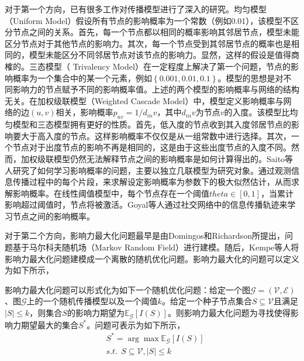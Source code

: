 对于第一个方向，已有很多工作对传播模型进行了深入的研究。均匀模型（Uniform Model）假设所有节点的影响概率为一个常数（例如0.01），该模型不区分节点之间的关系。首先，每一个节点都以相同的概率影响其邻居节点，模型未能区分节点对于其他节点的影响力。其次，每一个节点受到其邻居节点的概率也是相同的，模型未能区分不同邻居节点对该节点的影响力。显然，这样的假设是值得商榷的。三态模型（ Trivalency Model）在一定程度上解决了第一个问题，节点的影响概率为一个集合中的某一个元素，例如$\left\{ 0.001, 0.01, 0.1\right\}$。模型的思想是对不同影响力的节点赋予不同的影响概率值。上述的两个模型的影响概率与网络的结构无关。在加权级联模型（Weighted Cascade Model）中，模型定义影响概率与网络的边$\left(u,v\right)$相关，影响概率$p_{uv}=1/d_{in}v$，其中$d_{in}v$为节点$v$的入度。该模型比均匀模型和三态模型拥有更好的性质。首先，低入度的节点收到其入度邻居节点的影响要大于高入度的节点。这样影响概率不仅仅是从一组常数中进行选择。其次，一个节点对于出度节点的影响不再是相同的，这是由于这些出度节点的入度不同。然而，加权级联模型仍然无法解释节点之间的影响概率是如何计算得出的。Saito等人研究了如何学习影响概率的问题，主要以独立几联模型为研究对象。通过观测信息传播过程中的每个片段，来求解设定影响概率为参数下的极大似然估计，从而求解影响概率。在线性阈值模型中，每个节点存在一个阈值$theta \in \left[ 0,1 \right]$，当累计影响超过阈值时，节点将被激活。Goyal等人通过社交网络中的信息传播轨迹来学习节点之间的影响概率。

对于第二个方向，影响力最大化问题最早是由Domingos和Richardson所提出，问题基于马尔科夫随机场（Markov Random Field）进行建模。随后，Kempe等人将影响力最大化问题建模成一个离散的随机优化问题。影响力最大化的问题可以定义为如下所示，

\begin{defn}[影响力最大化问题]
\label{def:imProblem}
影响力最大化问题可以形式化为如下一个随机优化问题：给定一个图$\mathcal{G} = \left(\mathcal{V}, \mathcal{E}\right)$、图$\mathcal{G}$上的一个随机传播模型以及一个阈值$k$。给定一个种子节点集合$S \subseteq \mathcal{V}$且满足$\left\vert{S}\right\vert \leq k$，则集合$S$的影响力期望为$\mathbb{E}_\mathcal{G}\left[I\left(S\right)\right]$。则影响力最大化问题为寻找使得影响力期望最大的集合$S^{\ast}$。问题可表示为如下所示，
\begin{equation}
\label{eq:imProblem}
    \begin{split}
        &S^{\ast} = \arg\max{\mathbb{E}_\mathcal{G}\left[I\left(S\right)\right]}\\
        &s.t.~~S \subseteq \mathcal{V},\left\vert{S}\right\vert \leq k
    \end{split}
\end{equation}
\end{defn}

